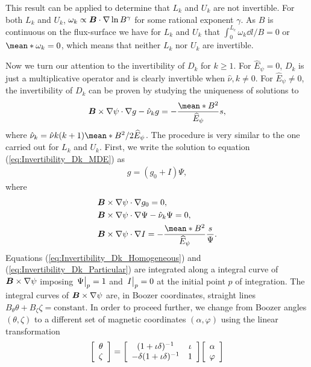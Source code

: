 \documentclass[10pt]{iopart}
\newcommand{\Matrix}[2]
{
	\mleft[
	\begin{array}{#1}
		#2
	\end{array}
	\mright]
}
\begin{document}
This result can be applied to determine that $L_k$ and $U_k$ are not invertible. For both $L_k$ and $U_k$, $\omega_k \propto \vb*{B}\cdot\nabla\ln B^\gamma$ for some rational exponent $\gamma$. As $B$ is continuous on the flux-surface we have for $L_k$ and $U_k$ that $\int_{0}^{L_{\text{c}}} \omega_k  {\dd{l}}/{B} =  0$ or $\mean*{\omega_k }=0$, which means that neither $L_k$ nor $U_k$ are invertible. 

Now we turn our attention to the invertibility of $D_k$ for $k\ge 1$. For $\widehat{E}_\psi =0$, $D_k$ is just a multiplicative operator and is clearly invertible when $\hat{\nu}, k\ne0$. For $\widehat{E}_\psi \ne 0$, the invertibility of $D_k$ can be proven by studying the uniqueness of solutions to
\begin{align} 
	\vb*{B}\times\nabla\psi\cdot \nabla g - \hat{\nu}_k g  = - \frac{\mean*{B^2}}{\widehat{E}_\psi} s,
	\label{eq:Invertibility_Dk_MDE}
\end{align}
where $\hat{\nu}_k = \hat{\nu} k (k+1) {\mean*{B^2}}/{2\widehat{E}_\psi}$. The procedure is very similar to the one carried out for $L_k$ and $U_k$. First, we write the solution to equation (\ref{eq:Invertibility_Dk_MDE}) as
%
\begin{align}
	g = ( g_0 + I ) \Psi,
	\label{eq:Invertibility_Dk_Variation_of_Constants}
\end{align}
where
%
\begin{align}
	& \vb*{B}\times\nabla\psi\cdot \nabla g_0 = 0,  \label{eq:Invertibility_Dk_constant}
	\\
	& \vb*{B}\times\nabla\psi\cdot \nabla \Psi - \hat{\nu}_k \Psi = 0,  \label{eq:Invertibility_Dk_Homogeneous}
	\\
	& \vb*{B}\times\nabla\psi\cdot \nabla I = - \frac{\mean*{B^2}}{\widehat{E}_\psi}\frac{s}{\Psi}.  \label{eq:Invertibility_Dk_Particular}
\end{align}
Equations (\ref{eq:Invertibility_Dk_Homogeneous}) and (\ref{eq:Invertibility_Dk_Particular}) are integrated along a integral curve of $\vb*{B}\times\nabla\psi$ imposing $\eval{\Psi}_{p}=1$ and $\eval{I}_{p}=0$ at the initial point $p$ of integration. The integral curves of $\vb*{B}\times\nabla\psi$ are, in Boozer coordinates, straight lines $B_\theta \theta + B_\zeta \zeta = \text{constant}$. In order to proceed further, we change from Boozer angles $(\theta,\zeta)$ to a different set of magnetic coordinates $(\alpha,\varphi)$ using the linear transformation
%
\begin{align}
	\Matrix{c}{\theta \\ \zeta}
	=
	\Matrix{cc}
	{
		(1 + \iota \delta)^{-1}	 &  \iota\\ 
		-\delta(1 + \iota \delta)^{-1}	 &  1
	}
	\Matrix{c}{\alpha \\ \varphi}
	\label{eq:Invertibility_Magnetic_Coordinates_Dk}
\end{align}
\end{document}
